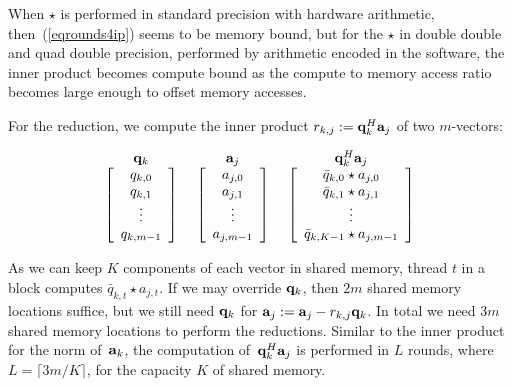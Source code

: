 \documentclass{article}
\newcommand\bfa{{\bf a}}
\newcommand\bfq{{\bf q}}
\begin{document}
When $\star$ is performed in standard precision with hardware arithmetic,
then~(\ref{eqrounds4ip}) seems to be memory bound,
but for the $\star$ in double double and quad double precision,
performed by arithmetic encoded in the software, the inner product
becomes compute bound as the compute to memory access ratio becomes
large enough to offset memory accesses.

For the reduction, we compute the inner product
$r_{k, j} := \bfq_k^H \bfa_j$ of two $m$-vectors:

\begin{equation}
  \begin{array}{c}
    \bfq_k \\
    \left[
      \begin{array}{c} q_{k,0} \\ q_{k,1} \\ \vdots \\ q_{k,m-1} \end{array}
    \right]
  \end{array}
  ~
  \begin{array}{c}
    \bfa_j \\
    \left[
      \begin{array}{c} a_{j,0} \\ a_{j,1} \\ \vdots \\ a_{j,m-1} \end{array}
    \right]
  \end{array}
  ~
  \begin{array}{c}
    \bfq_k^H \bfa_j \\
    \left[
      \begin{array}{c}
         \bar{q}_{k,0} \star a_{j,0} \\ 
         \bar{q}_{k,1} \star a_{j,1} \\ \vdots \\
         \bar{q}_{k,K-1} \star a_{j,m-1}
      \end{array}
    \right]
  \end{array}
\end{equation}

As we can keep $K$ components of each vector in shared memory,
thread $t$ in a block computes $\bar{q}_{k,t} \star a_{j,t}$.
If we may override $\bfq_k$, then $2 m$ shared memory locations suffice,
but we still need $\bfq_k$ for $\bfa_j := \bfa_j - r_{k, j} \bfq_k$.
In total we need $3 m$ shared memory locations to perform the reductions.
Similar to the inner product for the norm of~$\bfa_k$,
the computation of~$\bfq_k^H \bfa_j$ is performed in $L$ rounds,
where $L = \lceil 3m/K \rceil$, for the capacity $K$ of shared memory.
\end{document}
